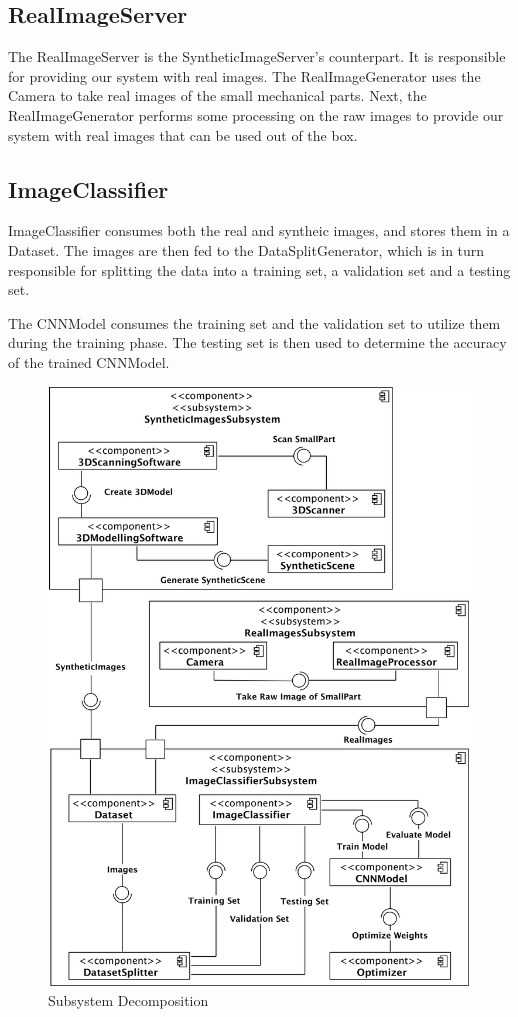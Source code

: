 \documentclass[a4paper,12pt,twoside]{report}
\begin{document}
\subsection{RealImageServer}
The RealImageServer is the SyntheticImageServer's counterpart. It is responsible for providing our system with real images. The RealImageGenerator uses the Camera to take real images of the small mechanical parts. Next, the RealImageGenerator performs some processing on the raw images to provide our system with real images that can be used out of the box.

\subsection{ImageClassifier}
ImageClassifier consumes both the real and syntheic images, and stores them in a Dataset. The images are then fed to the DataSplitGenerator, which is in turn responsible for splitting the data into a training set, a validation set and a testing set.

The CNNModel consumes the training set and the validation set to utilize them during the training phase. The testing set is then used to determine the accuracy of the trained CNNModel.

\begin{figure}[h]
\centering
  \includegraphics[width=\textwidth]{SSD}
\caption{Subsystem Decomposition}
\label{fig:SSD}
\end{figure}
\end{document}
